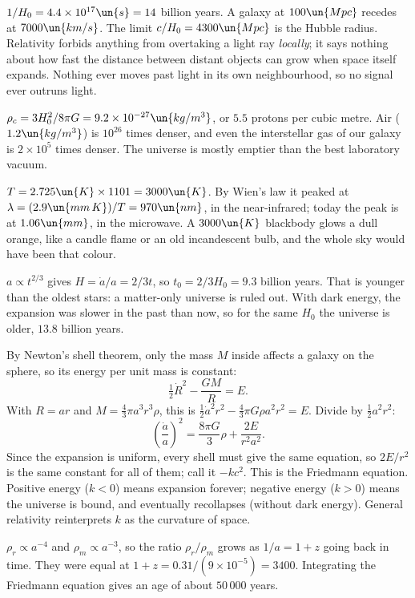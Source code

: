 
 $1/H_0 = 4.4\times10^{17}\un{s} = 14$ billion years. A galaxy at $100\un{Mpc}$ recedes at $7000\un{km/s}$. The limit $c/H_0 = 4300\un{Mpc}$ is the Hubble radius. Relativity forbids anything from overtaking a light ray \emph{locally}; it says nothing about how fast the distance between distant objects can grow when space itself expands. Nothing ever moves past light in its own neighbourhood, so no signal ever outruns light.

 $\rho_c = 3H_0^2/8\pi G = 9.2\times10^{-27}\un{kg/m^3}$, or $5.5$ protons per cubic metre. Air ($1.2\un{kg/m^3}$) is $10^{26}$ times denser, and even the interstellar gas of our galaxy is $2\times10^5$ times denser. The universe is mostly emptier than the best laboratory vacuum.

 $T = 2.725\un{K}\times1101 = 3000\un{K}$. By Wien's law it peaked at $\lambda = (2.9\un{mm\,K})/T = 970\un{nm}$, in the near-infrared; today the peak is at $1.06\un{mm}$, in the microwave. A $3000\un{K}$ blackbody glows a dull orange, like a candle flame or an old incandescent bulb, and the whole sky would have been that colour.

 $a\propto t^{2/3}$ gives $H = \dot a/a = 2/3t$, so $t_0 = 2/3H_0 = 9.3$ billion years. That is younger than the oldest stars: a matter-only universe is ruled out. With dark energy, the expansion was slower in the past than now, so for the same $H_0$ the universe is older, $13.8$ billion years.

 By Newton's shell theorem, only the mass $M$ inside affects a galaxy on the sphere, so its energy per unit mass is constant:
\[
  \tfrac12\dot R^2 - \frac{GM}{R} = E.
\]
With $R = ar$ and $M = \tfrac43\pi a^3r^3\rho$, this is $\tfrac12\dot a^2r^2 - \tfrac43\pi G\rho a^2r^2 = E$. Divide by $\tfrac12a^2r^2$:
\[
  \left(\frac{\dot a}{a}\right)^2 = \frac{8\pi G}{3}\rho + \frac{2E}{r^2a^2}.
\]
Since the expansion is uniform, every shell must give the same equation, so $2E/r^2$ is the same constant for all of them; call it $-kc^2$. This is the Friedmann equation. Positive energy ($k<0$) means expansion forever; negative energy ($k>0$) means the universe is bound, and eventually recollapses (without dark energy). General relativity reinterprets $k$ as the curvature of space.

 $\rho_r\propto a^{-4}$ and $\rho_m\propto a^{-3}$, so the ratio $\rho_r/\rho_m$ grows as $1/a = 1+z$ going back in time. They were equal at $1 + z = 0.31/(9\times10^{-5}) = 3400$. Integrating the Friedmann equation gives an age of about $50\,000$ years.

